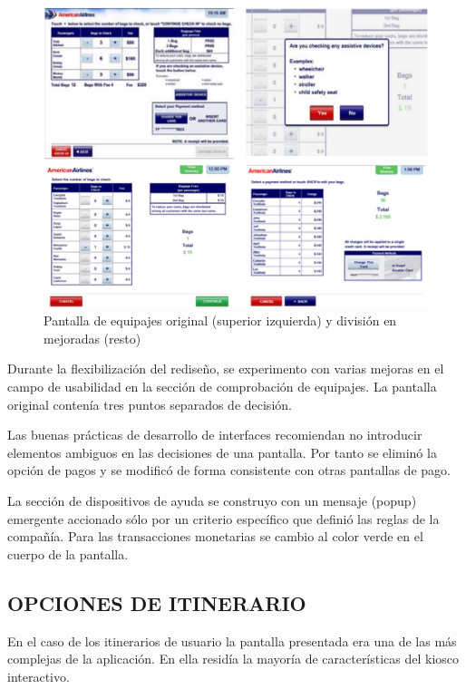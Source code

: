 \begin{figure}[ht]
    \begin{center}
        \includegraphics[width=425px]{src/img/american-baggages.pdf}
        \caption[Pantalla de
        equipajes original (superior izquierda) y división en mejoradas (resto)]
        {Pantalla de
        equipajes original (superior izquierda) y división en mejoradas (resto)}
        \label{fig:AmericanBaggages}
    \end{center}
\end{figure}

\newpage

Durante la flexibilización del rediseño, se experimento con varias mejoras en el
campo de usabilidad en la sección de comprobación de equipajes. La pantalla
original contenía tres puntos separados de decisión. 

Las buenas prácticas de 
desarrollo de interfaces recomiendan no introducir elementos 
ambiguos en las decisiones de una pantalla. Por tanto se eliminó la opción de
pagos y se modificó de forma consistente con otras pantallas de pago.

La sección de dispositivos de ayuda se construyo con un mensaje (popup)
emergente accionado sólo por un criterio específico que definió las reglas de la
compañía. Para las transacciones monetarias se cambio al color verde en el
cuerpo de la pantalla.

\subsection{\uppercase{Opciones de itinerario}}

En el caso de los itinerarios de usuario la pantalla presentada era una de las
más complejas de la aplicación. En ella residía la mayoría de características
del kiosco interactivo.

